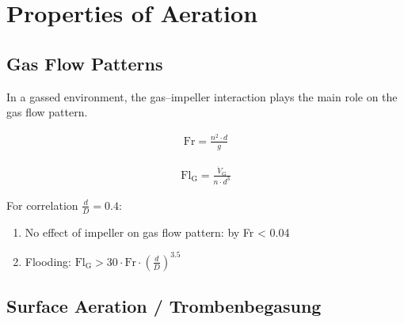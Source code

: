 \section{Properties of Aeration}

\subsection{Gas Flow Patterns}
In a gassed environment, the gas--impeller interaction plays the main role on the gas flow pattern.

\begin{gather}
    \text{Fr} = \frac{n^2 \cdot d}{g}
\end{gather}

\begin{gather}
    \text{Fl}_\text{G} = \frac{\Dot{V}_\text{G}}{n \cdot d^3}
\end{gather}

For correlation $\frac{d}{D} = 0.4$:

\begin{enumerate}
    \item No effect of impeller on gas flow pattern: by Fr < 0.04
    \item Flooding: $\text{Fl}_\text{G} > 30 \cdot \text{Fr} \cdot \left( \frac{d}{D} \right)^{3.5}$
\end{enumerate}

\subsection{Surface Aeration / Trombenbegasung}